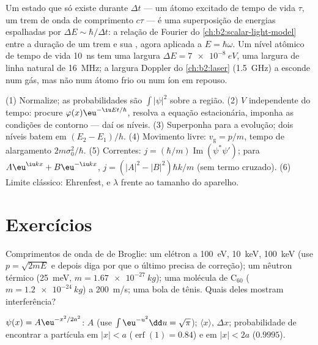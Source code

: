 \begin{remark}\label{rem:b2:schrodinger-wave-functions:energytime}
Um estado que só existe durante $\Delta t$ --- um átomo excitado de tempo de vida
$\tau$, um trem de onda de comprimento $c\tau$ --- é uma superposição de energias
espalhadas por $\Delta E \sim \hbar/\Delta t$: a relação de Fourier do
\cref{ch:b2:scalar-light-model} entre a duração de um trem e sua
, agora aplicada a $E = \hbar\omega$. Um nível atômico de
tempo de vida \qty{10}{ns} tem uma largura $\Delta E = \qty{7e-8}{eV}$, uma
largura de linha natural de \qty{16}{MHz}; a largura Doppler do \cref{ch:b2:laser}
(\qty{1.5}{GHz}) a esconde num gás, mas não num átomo frio ou num íon em
repouso.
\end{remark}

\begin{method}\label{meth:b2:schrodinger-wave-functions:method}
(1) Normalize; as probabilidades são $\int|\psi|^2$ sobre a região. (2)
$V$ independente do tempo: procure $\varphi(x)\eu^{-\iu Et/\hbar}$, resolva a
equação estacionária, imponha as condições de contorno --- daí os níveis.
(3) Superponha  para a evolução; dois níveis batem em
$(E_2 - E_1)/h$. (4) Movimento livre: $v_{\text{g}} = p/m$, tempo de alargamento
$2m\sigma_0^2/\hbar$. (5) Correntes: $j = (\hbar/m)\operatorname{Im}(\psi^*\psi')$;
para $A\eu^{\iu kx} + B\eu^{-\iu kx}$, $j = (|A|^2 - |B|^2)\hbar k/m$ (sem termo cruzado).
(6) Limite clássico: Ehrenfest, e $\lambda$ frente ao tamanho do
aparelho.
\end{method}

\section{Exercícios}

\begin{exercise}[$\star$]\label{exo:b2:schrodinger-wave-functions:1}
Comprimentos de onda de de Broglie: um elétron a \qty{100}{eV}, \qty{10}{keV},
\qty{100}{keV} (use $p = \sqrt{2mE}$ e depois diga por que o último precisa de
correção); um nêutron térmico (\qty{25}{meV}, $m = \qty{1.67e-27}{kg}$); uma
molécula de C$_{60}$ ($m = \qty{1.2e-24}{kg}$) a \qty{200}{m/s}; uma bola de
tênis. Quais deles mostram interferência?
\end{exercise}

\begin{exercise}[$\star$]\label{exo:b2:schrodinger-wave-functions:2}
$\psi(x) = A\eu^{-x^2/2a^2}$: $A$ (use $\int\eu^{-u^2}\dd u = \sqrt\pi$);
$\langle x\rangle$, $\Delta x$; probabilidade de encontrar a partícula em
$|x| < a$ ($\operatorname{erf}(1) = 0.84$) e em $|x| < 2a$ ($0.9995$).
\end{exercise}

